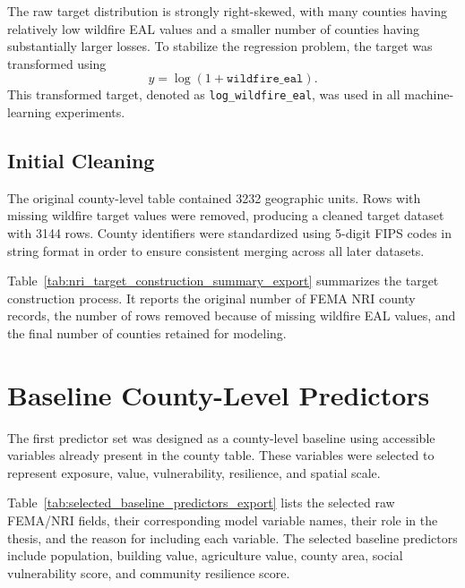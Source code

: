 The raw target distribution is strongly right-skewed, with many counties having relatively low wildfire EAL values and a smaller number of counties having substantially larger losses. To stabilize the regression problem, the target was transformed using
\begin{equation}
y = \log(1 + \texttt{wildfire\_eal}).
\end{equation}
This transformed target, denoted as \texttt{log\_wildfire\_eal}, was used in all machine-learning experiments.

\subsection{Initial Cleaning}

The original county-level table contained 3232 geographic units. Rows with missing wildfire target values were removed, producing a cleaned target dataset with 3144 rows. County identifiers were standardized using 5-digit FIPS codes in string format in order to ensure consistent merging across all later datasets.

Table~\ref{tab:nri_target_construction_summary_export} summarizes the target construction process. It reports the original number of FEMA NRI county records, the number of rows removed because of missing wildfire EAL values, and the final number of counties retained for modeling.

\begin{table}[htbp]
    \centering
    \caption{Target construction summary from the FEMA NRI county-level wildfire EAL table.}
    \label{tab:nri_target_construction_summary_export}
\end{table}

\section{Baseline County-Level Predictors}

The first predictor set was designed as a county-level baseline using accessible variables already present in the county table. These variables were selected to represent exposure, value, vulnerability, resilience, and spatial scale.

Table~\ref{tab:selected_baseline_predictors_export} lists the selected raw FEMA/NRI fields, their corresponding model variable names, their role in the thesis, and the reason for including each variable. The selected baseline predictors include population, building value, agriculture value, county area, social vulnerability score, and community resilience score.

